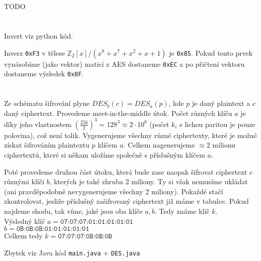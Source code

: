 \documentclass[12pt, a4paper]{article}
\begin{document}
\section{}
TODO

\section{}
Invert viz python kód.


Inverz \texttt{0xF3} v tělese $\mathbb{Z}_2[x]/(x^8+x^7+x^2+x+1)$ je \texttt{0x85}. Pokud tento prvek vynásobíme (jako vektor) maticí z AES dostaneme \texttt{0xEC} a po přičtení vektoru dostaneme výsledek \texttt{0x8F}.

\section{}
Ze schématu šifrování plyne $DES_{b}(c)=DES_{a}(p)$, kde $p$ je daný plaintext a $c$ daný ciphertext. Provedeme meet-in-the-middle útok. Počet různých klíču $a$ je díky jeho vlastnostem $(\frac{256}{2})^3=128^3\approx2\cdot 10^6$ (počet $k_i$ s lichou paritou je pouze polovina), což není tolik. Vygenerujeme všechny různé ciphertexty, které je možné získat šifrováním plaintextu $p$ klíčem $a$. Celkem nagenerujeme $\approx 2$ milionu ciphertextů, které si někam uložíme společně s příslušným klíčem $a$.

Poté provedeme druhou část útoku, která bude zase naopak šifrovat ciphertext $c$ různými klíči $b$, kterých je také zhruba 2 miliony. Ty si však nemusíme ukládat (ani pravděpodobně nevygenerujeme všechny 2 miliony). Pokaždé stačí zkontrolovat, jesliže příslušný zašifrovaný ciphertext již máme v tabulce. Pokud najdeme shodu, tak víme, jaké jsou oba klíče $a,b$. Tedy známe klíč $k$.\\
Výsledný klíč $a = \texttt{07:07:07:01:01:01:01:01}$\\
$b = \texttt{0B:0B:0B:01:01:01:01:01}$\\
Celkem tedy $k = \texttt{07:07:07:0B:0B:0B}$


Zbytek viz Java kód \texttt{main.java} + \texttt{DES.java}

\section{}
\end{document}
